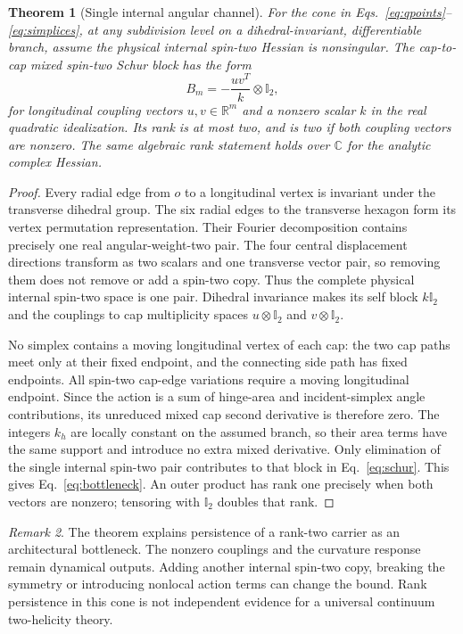 \documentclass[11pt]{article}
\newtheorem{theorem}{Theorem}[section]
\theoremstyle{remark}\newtheorem{remark}[theorem]{Remark}
\newcommand{\R}{\mathbb R}
\newcommand{\Id}{\mathbb I}
\begin{document}
\begin{theorem}[Single internal angular channel]
\label{thm:rank}
For the cone in Eqs.~\eqref{eq:qpoints}--\eqref{eq:simplices}, at any subdivision level on a dihedral-invariant, differentiable branch, assume the physical internal spin-two Hessian is nonsingular.
The cap-to-cap mixed spin-two Schur block has the form
\begin{equation}
B_m=-\frac{uv^T}{k}\otimes\Id_2,
\label{eq:bottleneck}
\end{equation}
for longitudinal coupling vectors $u,v\in\R^m$ and a nonzero scalar $k$ in the real quadratic idealization.
Its rank is at most two, and is two if both coupling vectors are nonzero.
The same algebraic rank statement holds over $\mathbb C$ for the analytic complex Hessian.
\end{theorem}
\begin{proof}
Every radial edge from $o$ to a longitudinal vertex is invariant under the transverse dihedral group.
The six radial edges to the transverse hexagon form its vertex permutation representation.
Their Fourier decomposition contains precisely one real angular-weight-two pair.
The four central displacement directions transform as two scalars and one transverse vector pair, so removing them does not remove or add a spin-two copy.
Thus the complete physical internal spin-two space is one pair.
Dihedral invariance makes its self block $k\Id_2$ and the couplings to cap multiplicity spaces $u\otimes\Id_2$ and $v\otimes\Id_2$.

No simplex contains a moving longitudinal vertex of each cap: the two cap paths meet only at their fixed endpoint, and the connecting side path has fixed endpoints.
All spin-two cap-edge variations require a moving longitudinal endpoint.
Since the action is a sum of hinge-area and incident-simplex angle contributions, its unreduced mixed cap second derivative is therefore zero.
The integers $k_h$ are locally constant on the assumed branch, so their area terms have the same support and introduce no extra mixed derivative.
Only elimination of the single internal spin-two pair contributes to that block in Eq.~\eqref{eq:schur}.
This gives Eq.~\eqref{eq:bottleneck}.
An outer product has rank one precisely when both vectors are nonzero; tensoring with $\Id_2$ doubles that rank.
\end{proof}

\begin{remark}
The theorem explains persistence of a rank-two carrier as an architectural bottleneck.
The nonzero couplings and the curvature response remain dynamical outputs.
Adding another internal spin-two copy, breaking the symmetry or introducing nonlocal action terms can change the bound.
Rank persistence in this cone is not independent evidence for a universal continuum two-helicity theory.
\end{remark}
\end{document}
